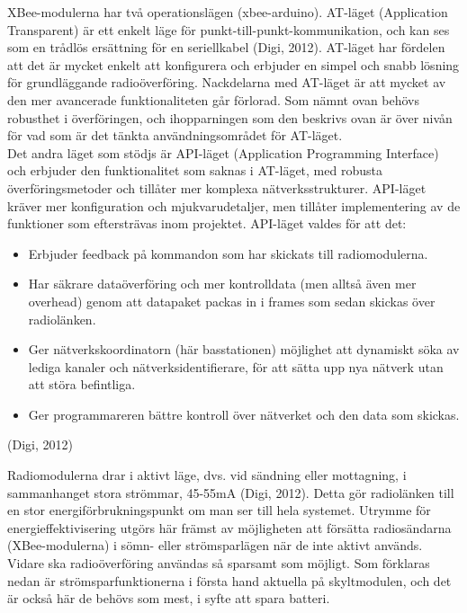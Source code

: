\documentclass[a4paper,11pt]{article}
\begin{document}
XBee-modulerna har två operationslägen (xbee-arduino). AT-läget (Application Transparent) är ett enkelt läge för punkt-till-punkt-kommunikation, och kan ses som en trådlös ersättning för en seriellkabel (Digi, 2012). AT-läget har fördelen att det är mycket enkelt att konfigurera och erbjuder en simpel och snabb lösning för grundläggande radioöverföring. Nackdelarna med AT-läget är att mycket av den mer avancerade funktionaliteten går förlorad. Som nämnt ovan behövs robusthet i överföringen, och ihopparningen som den beskrivs ovan är över nivån för vad som är det tänkta användningsområdet för AT-läget. \\

Det andra läget som stödjs är API-läget (Application Programming Interface) och erbjuder den funktionalitet som saknas i AT-läget, med robusta överföringsmetoder och tillåter mer komplexa nätverksstrukturer. API-läget kräver mer konfiguration och mjukvarudetaljer, men tillåter implementering av de funktioner som eftersträvas inom projektet. API-läget valdes för att det:
	
	\begin{itemize}
	\item Erbjuder feedback på kommandon som har skickats till radiomodulerna.
    	\item Har säkrare dataöverföring och mer kontrolldata (men alltså även mer overhead) genom att datapaket packas in i frames som sedan skickas över radiolänken.
    	\item Ger nätverkskoordinatorn (här basstationen) möjlighet att dynamiskt söka av lediga kanaler och nätverksidentifierare, för att sätta upp nya nätverk utan att störa befintliga.
    	\item Ger programmareren bättre kontroll över nätverket och den data som skickas.
    	\end{itemize}
(Digi, 2012)
    	
Radiomodulerna drar i aktivt läge, dvs. vid sändning eller mottagning, i sammanhanget stora strömmar, 45-55mA (Digi, 2012). Detta gör radiolänken till en stor energiförbrukningspunkt om man ser till hela systemet. Utrymme för energieffektivisering utgörs här främst av möjligheten att försätta radiosändarna (XBee-modulerna) i sömn- eller strömsparlägen när de inte aktivt används. Vidare ska radioöverföring användas så sparsamt som möjligt. Som förklaras nedan är strömsparfunktionerna i första hand aktuella på skyltmodulen, och det är också här de behövs som mest, i syfte att spara batteri. \\
\end{document}
